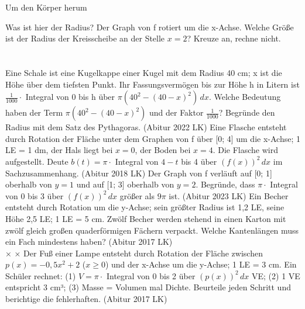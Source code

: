 \setcounter{aufgabe}{9}

\begin{aufgabe}{Um den Körper herum}
\begin{teile}
\teil Was ist hier der Radius? Der Graph von f rotiert um die x-Achse. Welche Größe ist der Radius der Kreisscheibe an der Stelle $x = 2$? Kreuze an, rechne nicht. \\  \\  \\ 
\teil Eine Schale ist eine Kugelkappe einer Kugel mit dem Radius 40 cm; x ist die Höhe über dem tiefsten Punkt. Ihr Fassungsvermögen bis zur Höhe h in Litern ist $\tfrac{1}{1000} \cdot$ Integral von 0 bis h über $\pi(40^2 - (40 - x)^2)\,dx$. Welche Bedeutung haben der Term $\pi(40^2 - (40 - x)^2)$ und der Faktor $\tfrac{1}{1000}$? Begründe den Radius mit dem Satz des Pythagoras. \hfill (Abitur 2022 LK)
\teil Eine Flasche entsteht durch Rotation der Fläche unter dem Graphen von f über [0; 4] um die x-Achse; 1 LE = 1 dm, der Hals liegt bei $x = 0$, der Boden bei $x = 4$. Die Flasche wird aufgestellt. Deute $b(t) = \pi \cdot$ Integral von $4 - t$ bis 4 über $(f(x))^2\,dx$ im Sachzusammenhang. \hfill (Abitur 2018 LK)
\teil Der Graph von f verläuft auf [0; 1] oberhalb von $y = 1$ und auf [1; 3] oberhalb von $y = 2$. Begründe, dass $\pi \cdot$ Integral von 0 bis 3 über $(f(x))^2\,dx$ größer als $9\pi$ ist. \hfill (Abitur 2023 LK)
\teil Ein Becher entsteht durch Rotation um die y-Achse; sein größter Radius ist 1,2 LE, seine Höhe 2,5 LE; 1 LE = 5 cm. Zwölf Becher werden stehend in einen Karton mit zwölf gleich großen quaderförmigen Fächern verpackt. Welche Kantenlängen muss ein Fach mindestens haben? \hfill (Abitur 2017 LK) \\ \leerfeld[cm] × \leerfeld[cm] × \leerfeld[cm]
\teil Der Fuß einer Lampe entsteht durch Rotation der Fläche zwischen $p(x) = -0{,}5x^2 + 2$ ($x \ge 0$) und der x-Achse um die y-Achse; 1 LE = 3 cm. Ein Schüler rechnet: (1) $V = \pi \cdot$ Integral von 0 bis 2 über $(p(x))^2\,dx$ VE; (2) 1 VE entspricht 3 cm³; (3) Masse = Volumen mal Dichte. Beurteile jeden Schritt und berichtige die fehlerhaften. \hfill (Abitur 2017 LK)
\end{teile}
\end{aufgabe}

